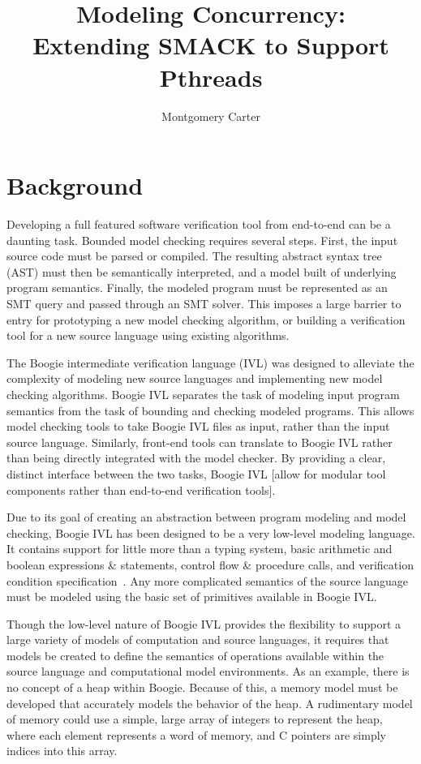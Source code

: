 \message{ !name(thesis.tex)}\documentclass[11pt,Chicago]{uuthesis}
\title{Modeling Concurrency:\protect\\Extending SMACK to Support Pthreads}
\author{Montgomery Carter}
\begin{document}
\chapter{Background}
Developing a full featured software verification tool from end-to-end can be a daunting task.  Bounded model checking requires several steps.  First, the input source code must be parsed or compiled.  The resulting abstract syntax tree (AST) must then be semantically interpreted, and a model built of underlying program semantics.  Finally, the modeled program must be represented as an SMT query and passed through an SMT solver.  This imposes a large barrier to entry for prototyping a new model checking algorithm, or building a verification tool for a new source language using existing algorithms.

The Boogie intermediate verification language (IVL) was designed to alleviate the complexity of modeling new source languages and implementing new model checking algorithms.  Boogie IVL separates the task of modeling input program semantics from the task of bounding and checking modeled programs.  This allows model checking tools to take Boogie IVL files as input, rather than the input source language.  Similarly, front-end tools can translate to Boogie IVL rather than being directly integrated with the model checker.  By providing a clear, distinct interface between the two tasks, Boogie IVL [allow for modular tool components rather than end-to-end verification tools].

Due to its goal of creating an abstraction between program modeling and model checking, Boogie IVL has been designed to be a very low-level modeling language.  It contains support for little more than a typing system, basic arithmetic and boolean expressions \& statements, control flow \& procedure calls, and verification condition specification~\cite{boogie}.  Any more complicated semantics of the source language must be modeled using the basic set of primitives available in Boogie IVL.

Though the low-level nature of Boogie IVL provides the flexibility to support a large variety of models of computation and source languages, it requires that models be created to define the semantics of operations available within the source language and computational model environments.  As an example, there is no concept of a heap within Boogie.  Because of this, a memory model must be developed that accurately models the behavior of the heap.  A rudimentary model of memory could use a simple, large array of integers to represent the heap, where each element represents a word of memory, and C pointers are simply indices into this array.
\end{document}
